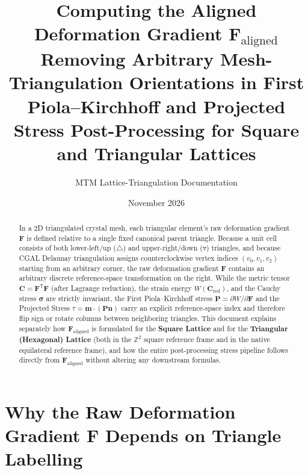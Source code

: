 \documentclass[11pt,a4paper]{article}
\title{\textbf{Computing the Aligned Deformation Gradient $\mathbf{F}_{\text{aligned}}$}\\[6pt]
\large Removing Arbitrary Mesh-Triangulation Orientations in First Piola--Kirchhoff and Projected Stress Post-Processing for Square and Triangular Lattices}
\author{MTM Lattice-Triangulation Documentation}
\date{November 2026}
\newcommand{\Z}{\mathbb{Z}}
\newcommand{\T}{^{\mathsf T}}
\begin{document}
\maketitle

\begin{abstract}
\noindent
In a 2D triangulated crystal mesh, each triangular element's raw deformation gradient $\mathbf{F}$ is defined relative to a single fixed canonical parent triangle. Because a unit cell consists of both lower-left/up ($\triangle$) and upper-right/down ($\triangledown$) triangles, and because CGAL Delaunay triangulation assigns counterclockwise vertex indices $(v_0, v_1, v_2)$ starting from an arbitrary corner, the raw deformation gradient $\mathbf{F}$ contains an arbitrary discrete reference-space transformation on the right. While the metric tensor $\mathbf{C} = \mathbf{F}\T\mathbf{F}$ (after Lagrange reduction), the strain energy $W(\mathbf{C}_{\text{red}})$, and the Cauchy stress $\boldsymbol{\sigma}$ are strictly invariant, the First Piola--Kirchhoff stress $\mathbf{P} = \partial W / \partial \mathbf{F}$ and the Projected Stress $\tau = \mathbf{m}\cdot(\mathbf{P}\mathbf{n})$ carry an explicit reference-space index and therefore flip sign or rotate columns between neighboring triangles. This document explains separately how $\mathbf{F}_{\text{aligned}}$ is formulated for the \textbf{Square Lattice} and for the \textbf{Triangular (Hexagonal) Lattice} (both in the $\Z^2$ square reference frame and in the native equilateral reference frame), and how the entire post-processing stress pipeline follows directly from $\mathbf{F}_{\text{aligned}}$ without altering any downstream formulas.
\end{abstract}

\tableofcontents

\section{Why the Raw Deformation Gradient $\mathbf{F}$ Depends on Triangle Labelling}
\end{document}

